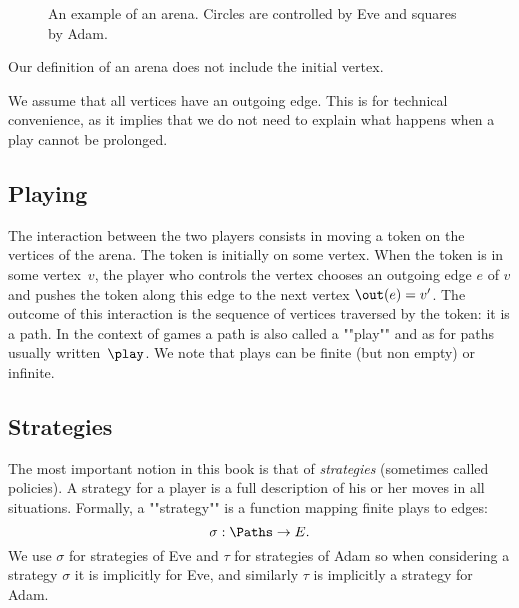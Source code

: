\begin{figure}
\centering
\caption{An example of an arena. Circles are controlled by Eve and squares by Adam.}
\label{1-fig:arena_example}
\end{figure}
Our definition of an arena does not include the initial vertex. %

We assume that all vertices have an outgoing edge.
This is for technical convenience, as it implies that we do not need to explain what happens when a play cannot be prolonged.

\subsection*{Playing}
The interaction between the two players consists in moving a token on the vertices of the arena.
The token is initially on some vertex.
When the token is in some vertex~$v$, the player who controls the vertex chooses an outgoing edge $e$ of $v$
and pushes the token along this edge to the next vertex $\out(e) = v'$.
The outcome of this interaction is the sequence of vertices traversed by the token: it is a path. 
In the context of games a path is also called a ""play"" and as for paths usually written~$\play$.
We note that plays can be finite (but non empty) or infinite.

\subsection*{Strategies}
The most important notion in this book is that of \textit{strategies} (sometimes called policies).
A strategy for a player is a full description of his or her moves in all situations.
Formally, a ""strategy"" is a function mapping finite plays to edges: 
\[
\sigma : \Paths \to E.
\]
We use $\sigma$ for strategies of Eve and $\tau$ for strategies of Adam so when considering a strategy $\sigma$ it is implicitly for Eve,
and similarly $\tau$ is implicitly a strategy for Adam.

